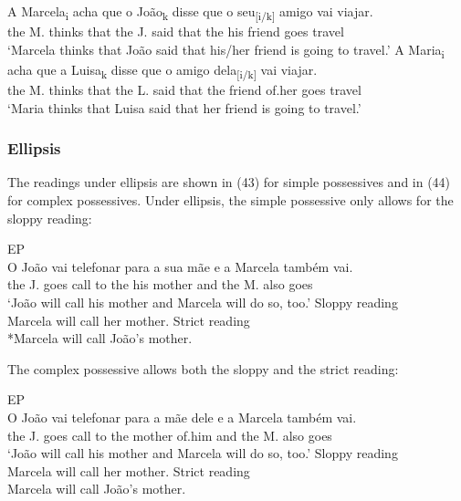 \documentclass[output=paper]{langsci/langscibook}
\begin{document}
\ea%
    \label{ex:wein:42}
    \ea
    \gll A Marcela\textsubscript{i} acha que o João\textsubscript{k} disse que o seu\textsubscript{[i/k]} amigo vai viajar.\\
         the M. thinks that the J. said that the his friend goes travel\\
    \glt ‘Marcela thinks that João said that his/her friend is going to travel.’
    \ex  
    \gll A Maria\textsubscript{i} acha que a Luisa\textsubscript{k} disse que o amigo dela\textsubscript{[i/k]} vai viajar.\\
         the M. thinks that the L. said that the friend of.her goes travel\\
    \glt ‘Maria thinks that Luisa said that her friend is going to travel.’
    \z
\z

\subsubsection{Ellipsis}%

The readings under ellipsis are shown in (43) for simple possessives and in (44) for complex possessives. Under ellipsis, the simple possessive only allows for the sloppy reading:

\ea%
         EP\label{ex:wein:43}\\
    \ea  
    \gll O João vai telefonar para a sua mãe e a Marcela também vai.\\
         the J.   goes call to the his mother and the M. also goes\\
    \glt ‘João will call his mother and Marcela will do so, too.’
    \ex Sloppy reading\\
        Marcela will call her mother.
    \ex Strict reading\\
        *Marcela will call João’s mother.
    \z  
\z

The complex possessive allows both the sloppy and the strict reading:

\ea%
         EP\label{ex:wein:44}\\
    \ea  
    \gll O João vai telefonar para a mãe   dele e   a Marcela também vai.\\
         the J. goes call to the mother of.him and the M. also goes\\
    \glt ‘João will call his mother and Marcela will do so, too.’
    \ex  Sloppy reading\\
         Marcela will call her mother.
    \ex  Strict reading\\
         Marcela will call João’s mother.
    \z
\z
\end{document}
